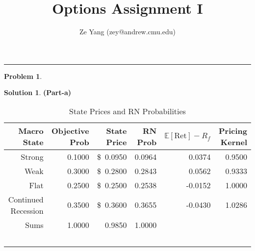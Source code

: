 \documentclass[a4paper, 10pt]{article}
\title{\textbf{Options Assignment I}}
\author{Ze Yang (zey@andrew.cmu.edu)}
\renewcommand{\arraystretch}{1.4}
\theoremstyle{definition}
\newtheorem{problem}{Problem}
\theoremstyle{hSol}
\newtheorem*{solution}{Solution}
\begin{document}
\maketitle



\noindent\rule{16cm}{0.4pt}

\begin{problem}
\end{problem}
\begin{solution} \textbf{(Part-a)}

\begin{table}[htbp]
  \centering
  \caption{State Prices and RN Probabilities}
  \label{rn}
  \vspace{4pt}
  \def\arraystretch{1.15}
    \begin{tabular}{rrrrrr}
    \toprule
    Macro State & Objective Prob & State Price & RN Prob & $\mathbb{E}\left[\text{Ret}\right]-R_f$& Pricing Kernel\\
    \hline
    Strong & 0.1000  & \$~0.0950 & 0.0964 & 0.0374 & 0.9500 \\
    Weak  & 0.3000  & \$~0.2800 & 0.2843 & 0.0562 & 0.9333 \\
    Flat  & 0.2500  & \$~0.2500 & 0.2538 & -0.0152 & 1.0000 \\
    Continued Recession & 0.3500  & \$~0.3600 & 0.3655 & -0.0430 & 1.0286 \\
    \hline
    Sums & 1.0000 & 0.9850 & 1.0000 \\
    \hline
    \hline
    ~\\


\end{tabular}
\end{table}
\end{solution}
\end{document}
